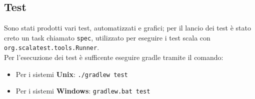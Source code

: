 \subsection{Test}
 Sono stati prodotti vari test, automatizzati e grafici; per il lancio dei test è stato creto un task chiamato \texttt{spec}, utilizzato per eseguire i test scala con \texttt{org.scalatest.tools.Runner}.\\
	Per l'esecuzione dei test è sufficente eseguire gradle tramite il comando:
	\begin{itemize}
		\item Per i sistemi \textbf{Unix}: \texttt{./gradlew test} 
		\item Per i sistemi \textbf{Windows}: \texttt{gradlew.bat test} 
	\end{itemize}
